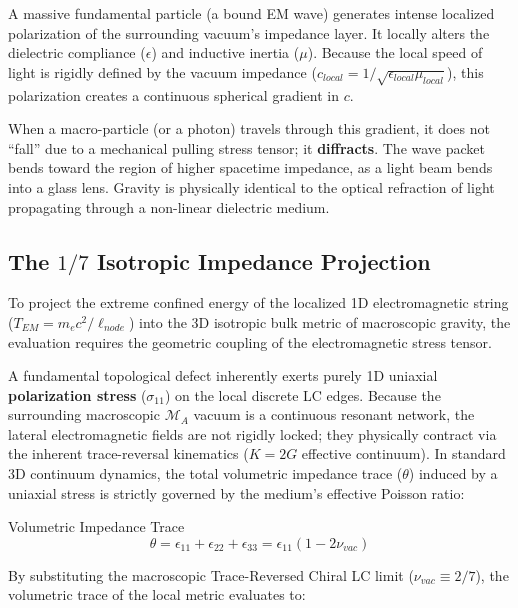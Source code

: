 A massive fundamental particle (a bound EM wave) generates intense localized polarization of the surrounding vacuum's impedance layer. It locally alters the dielectric compliance ($\epsilon$) and inductive inertia ($\mu$). Because the local speed of light is rigidly defined by the vacuum impedance ($c_{local} = 1/\sqrt{\epsilon_{local} \mu_{local}}$), this polarization creates a continuous spherical gradient in $c$.

When a macro-particle (or a photon) travels through this gradient, it does not ``fall'' due to a mechanical pulling stress tensor; it \textbf{diffracts}. The wave packet bends toward the region of higher spacetime impedance, as a light beam bends into a glass lens. Gravity is physically identical to the optical refraction of light propagating through a non-linear dielectric medium.

\subsection{The $1/7$ Isotropic Impedance Projection}

To project the extreme confined energy of the localized 1D electromagnetic string ($T_{EM}=m_{e}c^{2}/\ell_{node}$) into the 3D isotropic bulk metric of macroscopic gravity, the evaluation requires the geometric coupling of the electromagnetic stress tensor.

A fundamental topological defect inherently exerts purely 1D uniaxial \textbf{polarization stress} ($\sigma_{11}$) on the local discrete LC edges. Because the surrounding macroscopic $\mathcal{M}_{A}$ vacuum is a continuous resonant network, the lateral electromagnetic fields are not rigidly locked; they physically contract via the inherent trace-reversal kinematics ($K=2G$ effective continuum). In standard 3D continuum dynamics, the total volumetric impedance trace ($\theta$) induced by a uniaxial stress is strictly governed by the medium's effective Poisson ratio:

\begin{resultbox}{Volumetric Impedance Trace}
\begin{equation}
\theta=\epsilon_{11}+\epsilon_{22}+\epsilon_{33}=\epsilon_{11}(1-2\nu_{vac})
\end{equation}
\end{resultbox}

By substituting the macroscopic Trace-Reversed Chiral LC limit ($\nu_{vac}\equiv2/7$), the volumetric trace of the local metric evaluates to:

